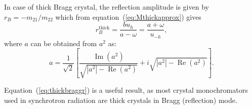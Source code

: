 \documentclass[preprint]{iucr}              %
\newcommand{\todo}[1]{{\color{red}[TODO: "#1'']}}
\newcommand{\inred}[1]{{\color{red}#1}}
\begin{document}







\inred{
In case of thick Bragg crystal, the reflection amplitude is given by $r_B=-m_{21}/m_{22}$ which from equation~(\ref{eq:Mthickapprox}) gives  
\begin{equation}\label{eq:thickbraggr}
    r_B^{\text{thick}} = \frac{b u_h}{a-\omega} = \frac{a+\omega}{u_{-h}},
\end{equation}
where $a$ can be obtained from $a^2$ as: 
\begin{equation}
a = \frac{1}{\sqrt{2}} \left[ \frac{\operatorname{Im}(a^2)}{\sqrt{|a^2|-\operatorname{Re}(a^2)}} + i \sqrt{|a^2|-\operatorname{Re}(a^2)} \right].
\end{equation}

Equation~(\ref{eq:thickbraggr}) is a useful result, as most crystal monochromators used in synchrotron radiation are thick crystals in Bragg (reflection) mode. 


}
\end{document}
